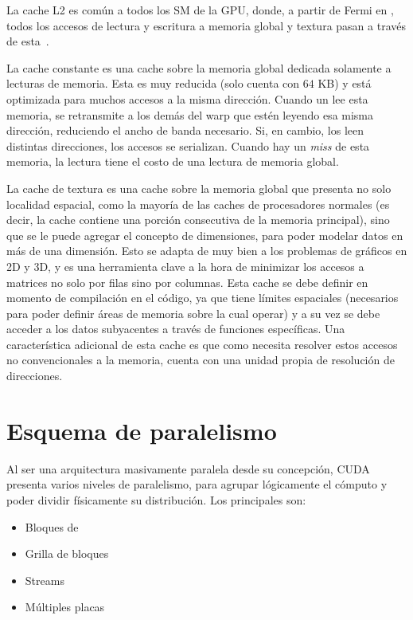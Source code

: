 La cache L2 es com\'un a todos los SM de la GPU, donde, a partir de Fermi en \nvidia{}, todos los accesos de lectura y escritura a memoria global y textura pasan a trav\'es de esta~\cite{NvidiaFermi}.

La cache constante es una cache sobre la memoria global dedicada solamente a lecturas de memoria.
Esta es muy reducida (solo cuenta con $64$ KB) y est\'a optimizada para muchos accesos a la misma direcci\'on.
Cuando un \thread{} lee esta memoria, se retransmite a los dem\'as \threads{} del warp que est\'en leyendo esa misma direcci\'on, reduciendo el ancho de banda necesario.
Si, en cambio, los \threads{} leen distintas direcciones, los accesos se serializan.
Cuando hay un \emph{miss} de esta memoria, la lectura tiene el costo de una lectura de memoria global.

La cache de textura es una cache sobre la memoria global que presenta no solo localidad espacial, como la mayor\'ia de las caches de procesadores normales (es decir, la cache contiene una porci\'on consecutiva de la memoria principal),
sino que se le puede agregar el concepto de dimensiones, para poder modelar datos en m\'as de una dimensi\'on.
Esto se adapta de muy bien a los problemas de gr\'aficos en 2D y 3D, y es una herramienta clave a la hora de minimizar los accesos a matrices no solo por filas sino por columnas.
Esta cache se debe definir en momento de compilaci\'on en el c\'odigo, ya que tiene l\'imites espaciales (necesarios para poder definir \'areas de memoria sobre la cual operar) 
y a su vez se debe acceder a los datos subyacentes a trav\'es de funciones espec\'ificas.
Una caracter\'istica adicional de esta cache es que como necesita resolver estos accesos no convencionales a la memoria, cuenta con una unidad propia de resoluci\'on de direcciones. 


\section{Esquema de paralelismo}

Al ser una arquitectura masivamente paralela desde su concepci\'on, CUDA presenta varios niveles de paralelismo, para agrupar l\'ogicamente el c\'omputo y poder dividir f\'isicamente su distribuci\'on.
Los principales son:
\begin{itemize}
  \item Bloques de \threads{}
  \item Grilla de bloques
  \item Streams
  \item M\'ultiples placas
\end{itemize}

